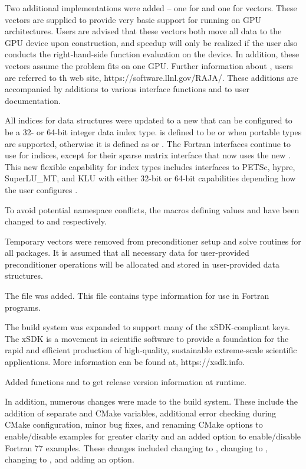 Two additional {\nvector} implementations were added -- one for
{\cuda} and one for {\raja} vectors.
These vectors are supplied to provide very basic support for running
on GPU architectures.  Users are advised that these vectors both move all data
to the GPU device upon construction, and speedup will only be realized if the
user also conducts the right-hand-side function evaluation on the device.
In addition, these vectors assume the problem fits on one GPU.
Further information about {\raja}, users are referred to th web site,
https://software.llnl.gov/RAJA/.
These additions are accompanied by additions to various interface functions
and to user documentation.

All indices for data structures were updated to a new  that
can be configured to be a 32- or 64-bit integer data index type.
 is defined to be  or  when portable types are
supported, otherwise it is defined as  or .
The Fortran interfaces continue to use  for indices, except for
their sparse matrix interface that now uses the new .
This new flexible capability for index types includes interfaces to
PETSc, hypre, SuperLU\_MT, and KLU with
either 32-bit or 64-bit capabilities depending how the user configures
{\sundials}.

To avoid potential namespace conflicts, the macros defining 
values  and  have been changed to  and
 respectively.

Temporary vectors were removed from preconditioner setup and solve
routines for all packages.  It is assumed that all necessary data
for user-provided preconditioner operations will be allocated and
stored in user-provided data structures.

The file  was added. This file contains
{\sundials} type information for use in Fortran programs.

The build system was expanded to support many of the xSDK-compliant keys.
The xSDK is a movement in scientific software to provide a foundation for the
rapid and efficient production of high-quality,
sustainable extreme-scale scientific applications.  More information can
be found at, https://xsdk.info.

Added functions  and  to
get {\sundials} release version information at runtime.

In addition, numerous changes were made to the build system.
These include the addition of separate  and 
CMake variables, additional error checking during CMake configuration,
minor bug fixes, and renaming CMake options to enable/disable examples
for greater clarity and an added option to enable/disable Fortran 77 examples.
These changes included changing  to ,
changing  to , changing  to
, and adding an  option.

